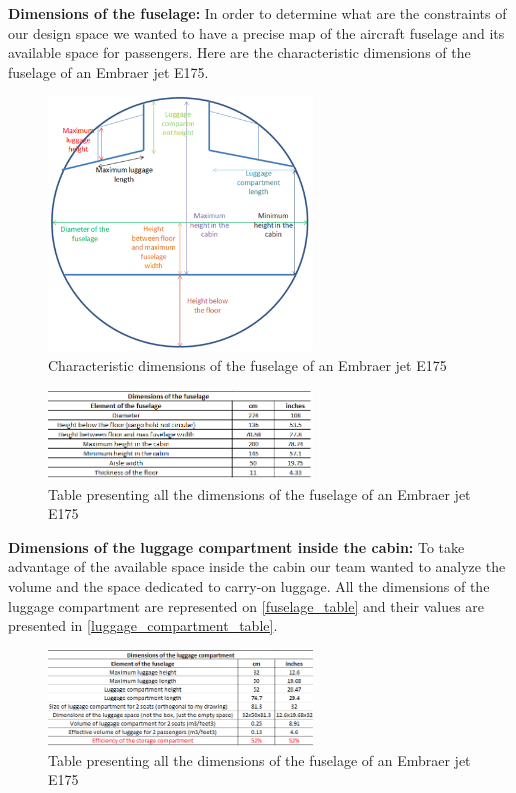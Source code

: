\textbf{Dimensions of the fuselage:}
In order to determine what are the constraints of our design space we wanted to have a precise map of the aircraft fuselage and its available space for passengers. Here are the characteristic dimensions of the fuselage of an Embraer jet E175.
\begin{figure}[h]
\centering
\includegraphics[width=7cm]{images/fuselage_dimensions}
\caption{Characteristic dimensions of the fuselage of an Embraer jet E175}
\label{fig: fuselage_dimensions}
\end{figure}

\begin{figure}[h]
\centering
\includegraphics[width=7cm]{images/fuselage_table}
\caption{Table presenting all the dimensions of the fuselage of an Embraer jet E175}
\label{fig: fuselage_table}
\end{figure}

\textbf{Dimensions of the luggage compartment inside the cabin:}
To take advantage of the available space inside the cabin our team wanted to analyze the volume and the space dedicated to carry-on luggage. All the dimensions of the luggage compartment are represented on \ref{fuselage_table} and their values are presented in \ref{luggage_compartment_table}.
\begin{figure}[h]
\centering
\includegraphics[width=7cm]{images/luggage_compartment_table}
\caption{Table presenting all the dimensions of the fuselage of an Embraer jet E175}
\label{fig: luggage_compartment_table}
\end{figure}

